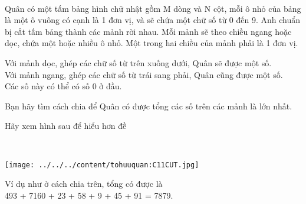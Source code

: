  

Quân có một tấm bảng hình chữ nhật gồm M dòng và N cột, mỗi ô nhỏ của bảng là một ô vuông có cạnh là 1 đơn vị, và sẽ chứa một chữ số từ 0 đến 9. Anh chuẩn bị cắt tấm bảng thành các mảnh rời nhau. Mỗi mảnh sẽ theo chiều ngang hoặc dọc, chứa một hoặc nhiều ô nhỏ. Một trong hai chiều của mảnh phải là 1 đơn vị.

Với mảnh dọc, ghép các chữ số từ trên xuống dưới, Quân sẽ được một số.
\\Với mảnh ngang, ghép các chữ số từ trái sang phải, Quân cũng được một số.
\\Các số này có thể có số 0 ở đầu.

Bạn hãy tìm cách chia để Quân có được tổng các số trên các mảnh là lớn nhất.

Hãy xem hình sau để hiểu hơn đề

 


\texttt{[image: ../../../content/tohuuquan:C11CUT.jpg]}

Ví dụ như ở cách chia trên, tổng có được là
\\493 + 7160 + 23 + 58 + 9 + 45 + 91 = 7879.

\